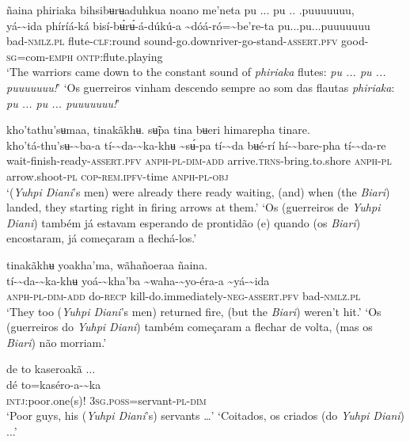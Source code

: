 \documentclass[output=paper,
modfonts,nonflat
]{langsci/langscibook}
\begin{document}
\ea ñaina phiriaka bihsibʉrʉaduhkua noano me'neta pu ... pu .. .puuuuuuu, \\[.3em]
\gll {\textasciitilde}yá-{\textasciitilde}ida 	phíríá-ká	bisí-bʉ́rʉ́-á-dúkú-a {\textasciitilde}dóá-ró={\textasciitilde}be're-ta	pu...pu...puuuuuuu\\
     bad\textsc{-nmlz.pl}	flute-\textsc{clf:}round	sound-go.downriver-go-stand-\textsc{assert.pfv} good\textsc{-sg}=com-\textsc{emph}	\textsc{ontp:}flute.playing\\
\glt ‘The warriors came down to the constant sound of \textit{phiriaka} flutes: \textit{pu ... pu ... puuuuuuu!}’ 
\glt ‘Os guerreiros vinham descendo sempre ao som das flautas \textit{phiriaka}: \textit{pu ... pu ... puuuuuuu!}’ 
\z 

\newpage 
\ea kho'tathu'sʉmaa, tinakãkhʉ. sʉ̃pa tina bʉeri himarepha tinare. \\[.3em]
\gll kho'tá-thu'sʉ-{\textasciitilde}ba-a	tí-{\textasciitilde}da-{\textasciitilde}ka-khʉ	{\textasciitilde}sʉ́-pa	tí-{\textasciitilde}da bʉé-rí	hí-{\textasciitilde}bare-pha	tí-{\textasciitilde}da-re\\
     wait-finish-ready-\textsc{assert.pfv}	\textsc{anph-pl-dim-add}	arrive.\textsc{trns}-bring.to.shore	\textsc{anph-pl} arrow.shoot\textsc{-pl}	\textsc{cop-rem.ipfv}-time	\textsc{anph-pl-obj}\\
\glt ‘(\textit{Yuhpi Diani}'s men) were already there ready waiting, (and) when (the \textit{Biari}) landed, they starting right in firing arrows at them.’
\glt ‘Os (guerreiros de \textit{Yuhpi Diani}) também já estavam esperando de prontidão (e) quando (os \textit{Biari}) encostaram, já começaram a flechá-los.’
\z 

\ea tinakãkhʉ yoakha'ma, wãhañoeraa ñaina. \\[.3em]
\gll tí-{\textasciitilde}da-{\textasciitilde}ka-khʉ	yoá-{\textasciitilde}kha'ba	{\textasciitilde}waha-{\textasciitilde}yo-éra-a	{\textasciitilde}yá-{\textasciitilde}ida \\
     \textsc{anph-pl-dim-add}	do-\textsc{recp}	kill-do.immediately\textsc{-neg-assert.pfv}	bad\textsc{-nmlz.pl}\\
\glt ‘They too (\textit{Yuhpi Diani}'s men) returned fire, (but the \textit{Biari}) weren’t hit.’
\glt ‘Os (guerreiros do \textit{Yuhpi Diani}) também começaram a flechar de volta, (mas os \textit{Biari}) não morriam.’
\z 

\ea de to kaseroakã ... \\[.3em]
\gll dé	to=kaséro-a-{\textasciitilde}ka \\
     \textsc{intj:}poor.one(s)!	3\textsc{sg.poss}=servant\textsc{-pl-dim}\\
\glt ‘Poor guys, his (\textit{Yuhpi Diani}'s) servants …’
\glt ‘Coitados, os criados (do \textit{Yuhpi Diani}) ...’
\z 
\end{document}
